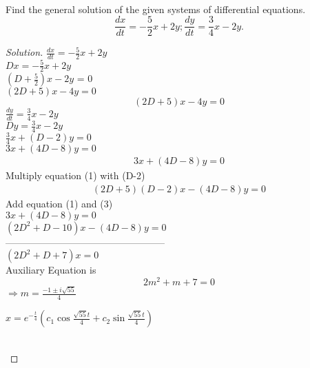 \documentclass[12pt]{article}
\newenvironment{problem}[2][Problem]{\begin{trivlist}
\item[\hskip \labelsep {\bfseries #1}\hskip \labelsep {\bfseries #2.}]}{\end{trivlist}}
\begin{document}
\begin{problem}{7}
\text{ }\\
Find the general solution of the given systems of differential equations.\\
    $$\frac{dx}{dt} = -\frac{5}{2}x+2y ; \frac{dy}{dt} = \frac{3}{4}x-2y.$$

\end{problem}
\begin{proof}[Solution]

$\frac{dx}{dt} = -\frac{5}{2}x+2y $  \\

$ Dx = -\frac{5}{2} x +2y$  \\

$(D+\frac{5}{2})x - 2y $  = 0 \\

$ (2D +5 )x  - 4y = 0 $  \\
\begin{equation} (2D + 5) x - 4y    = 0   \end{equation} 
 $\frac{dy}{dt} = \frac{3}{4}x-2y$  \\
 
 $ Dy = \frac{3}{4} x - 2y $  \\
 
$ \frac{3}{4} x + (D-2) y = 0 $ \\

$ 3x + (4D - 8)y = 0 $  \\
\begin{align} 3x + (4D - 8)y = 0\end{align} 
Multiply equation (1) with (D-2) \\

\begin{align} (2D+5)(D-2)x - (4D-8)y  = 0  \end{align} 
Add equation (1) and (3) \\

$3x + (4D - 8)y = 0$ \\
$(2D^2 + D - 10)x - (4D - 8)y = 0$ \\
--------------------------------------------------\\
$(2D^2 + D + 7)x  =  0$ \\

Auxiliary Equation is \\
$$2m^2 + m + 7 = 0 $$ 
$\Rightarrow  m = \frac{-1 \pm i\sqrt{55}}{4} $ \\

\begin{Large} $x = e^{-\frac{t}{4}}(c_1 \cos{\frac{\sqrt{55}t}{4}} + c_2 \sin{\frac{\sqrt{55}t}{4}})$  \end{Large}  \\


\end{proof}
\end{document}

